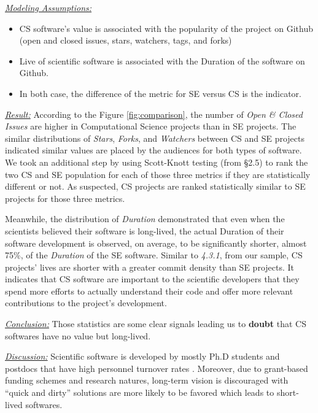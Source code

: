 \documentclass[sigconf,review,anonymous]{acmart}
\newcommand{\bi}{\begin{itemize}}
\newcommand{\ei}{\end{itemize}}
\newenvironment{RQ}{\vspace{1mm}\begin{tcolorbox}[enhanced,width=3.4in,size=fbox,colback=red!5!white,drop shadow southwest,sharp corners]}{\end{tcolorbox}}
\begin{document}
\noindent \textit{\underline{Modeling Assumptions:}} 
\bi
\item CS software's value is associated with the popularity of the project on Github (open and closed issues, stars, watchers, tags, and forks)
\item Live of scientific software is associated with the Duration of the software on Github. 
\item In both case, the difference of the metric for SE versus CS is the indicator. 
\ei


\noindent \textit{\underline{Result:}} According to the Figure \ref{fig:comparison}, the number of \textit{Open \& Closed Issues} are higher in Computational Science projects than in SE projects. The similar distributions of \textit{Stars}, \textit{Forks}, and \textit{Watchers} between CS and SE projects indicated similar values are placed by the audiences for both types of software. We took an additional step by using Scott-Knott testing (from \S2.5)  to rank the two CS and SE population for each of those three metrics if they are statistically different or not. As suspected, CS projects are ranked statistically similar to SE projects for those three metrics. 

Meanwhile, the distribution of \textit{Duration} demonstrated that even when the scientists believed their software is long-lived, the actual Duration of their software development is observed, on average, to be significantly shorter, almost 75\%, of the \textit{Duration} of the SE software. Similar to \textit{4.3.1}, from our sample, CS projects' lives are shorter with a greater commit density than SE projects. It indicates that CS software are important to the scientific developers that they spend more efforts to actually understand their code and offer more relevant contributions to the project's development.   


\begin{RQ}
\textit{\underline{Conclusion:}} Those statistics are some clear signals leading us to \textbf{doubt} that CS softwares have no value but long-lived.  
\end{RQ}

\noindent \textit{\underline{Discussion:}} Scientific software is developed by mostly Ph.D students and postdocs that have high personnel turnover rates \cite{johan18_secs}. Moreover, due to grant-based funding schemes and research natures, long-term vision is discouraged with ``quick and dirty'' solutions are more likely to be favored \cite{boyle09_lessons} which leads to short-lived softwares. 
\end{document}
